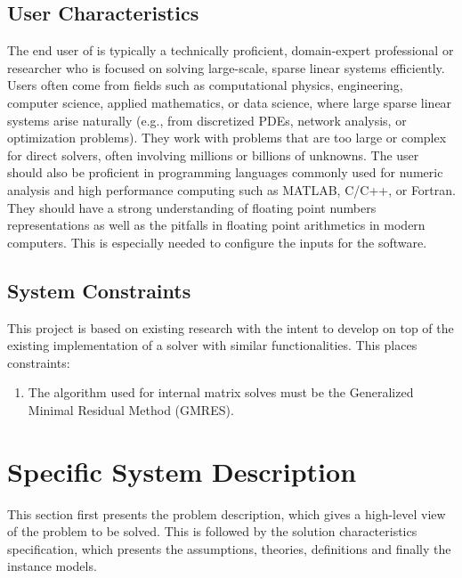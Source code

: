 \documentclass[12pt]{article}
\begin{document}
\subsection{User Characteristics} \label{SecUserCharacteristics}

The end user of \progname{} is typically a technically proficient, domain-expert
professional or researcher who is focused on solving large-scale, sparse linear
systems efficiently. Users often come from fields such as computational physics,
engineering, computer science, applied mathematics, or data science, where large
sparse linear systems arise naturally (e.g., from discretized PDEs, network
analysis, or optimization problems). They work with problems that are too large
or complex for direct solvers, often involving millions or billions of unknowns.
The user should also be proficient in programming languages commonly used for
numeric analysis and high performance computing such as MATLAB, C/C++, or
Fortran. They should have a strong understanding of floating point numbers
representations as well as the pitfalls in floating point arithmetics in modern
computers. This is especially needed to configure the inputs for the software.

\subsection{System Constraints}

This project is based on existing research with the intent to develop on top of
the existing implementation of a solver with similar functionalities. This
places constraints:

\begin{enumerate}
\item The algorithm used for internal matrix solves must be the Generalized Minimal
  Residual Method (GMRES).
\end{enumerate}

\section{Specific System Description}

This section first presents the problem description, which gives a high-level
view of the problem to be solved.  This is followed by the solution characteristics
specification, which presents the assumptions, theories, definitions and finally
the instance models.  
\end{document}
